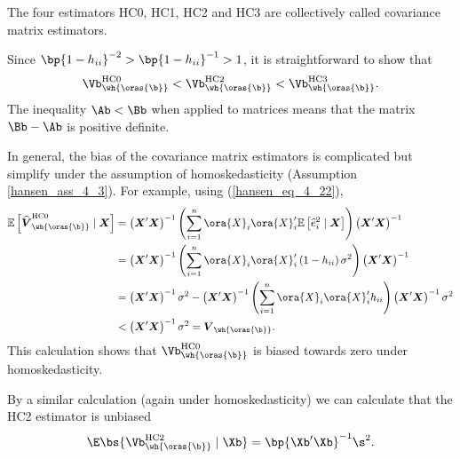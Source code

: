 The four estimators HC0, HC1, HC2 and HC3 are collectively called  covariance matrix estimators. 

Since $\bp{1-h_{ii}}^{-2} > \bp{1-h_{ii}}^{-1} > 1$, it is straightforward to show that 
\begin{equation}
    \label{hansen_eq_4_35}
    \Vb_{\wh{\oras{\b}}}^{\text{HC0}} < \Vb_{\wh{\oras{\b}}}^{\text{HC2}} < \Vb_{\wh{\oras{\b}}}^{\text{HC3}} .
\end{equation}
The inequality $\Ab < \Bb$ when applied to matrices means that the matrix $\Bb - \Ab$ is positive definite.

In general, the bias of the covariance matrix estimators is complicated but simplify under the assumption of homoskedasticity (Assumption \ref{hansen_ass_4_3}). For example, using (\ref{hansen_eq_4_22}), 
\begin{equation}
    \notag
    \begin{aligned}
        \mathbb{E}\left[\widehat{\boldsymbol{V}}_{\wh{\oras{\b}}}^{\mathrm{HC0}} \mid \boldsymbol{X}\right] & =\left(\boldsymbol{X}^{\prime} \boldsymbol{X}\right)^{-1}\left(\sum_{i=1}^n \ora{X}_i \ora{X}_i^{\prime} \mathbb{E}\left[\widehat{e}_i^2 \mid \boldsymbol{X}\right]\right)\left(\boldsymbol{X}^{\prime} \boldsymbol{X}\right)^{-1} \\
        & =\left(\boldsymbol{X}^{\prime} \boldsymbol{X}\right)^{-1}\left(\sum_{i=1}^n \ora{X}_i \ora{X}_i^{\prime}\left(1-h_{i i}\right) \sigma^2\right)\left(\boldsymbol{X}^{\prime} \boldsymbol{X}\right)^{-1} \\
        & =\left(\boldsymbol{X}^{\prime} \boldsymbol{X}\right)^{-1} \sigma^2-\left(\boldsymbol{X}^{\prime} \boldsymbol{X}\right)^{-1}\left(\sum_{i=1}^n \ora{X}_i \ora{X}_i^{\prime} h_{i i}\right)\left(\boldsymbol{X}^{\prime} \boldsymbol{X}\right)^{-1} \sigma^2 \\
        & <\left(\boldsymbol{X}^{\prime} \boldsymbol{X}\right)^{-1} \sigma^2 =\boldsymbol{V}_{\wh{\oras{\b}}} .
    \end{aligned}
\end{equation}
This calculation shows that $\Vb_{\wh{\oras{\b}}}^{\text{HC0}}$ is biased towards zero under homoskedasticity.

By a similar calculation (again under homoskedasticity) we can calculate that the HC2 estimator is unbiased
\begin{equation}
    \label{4.36}
    \E\bs{\Vb_{\wh{\oras{\b}}}^{\text{HC2}} \mid \Xb} = \bp{\Xb^\prime \Xb}^{-1} \s^2.
\end{equation}

